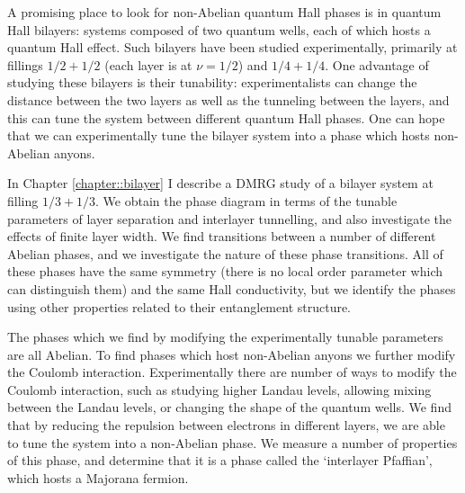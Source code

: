 A promising place to look for non-Abelian quantum Hall phases is in quantum Hall bilayers: systems composed of two quantum wells, each of which hosts a quantum Hall effect. Such bilayers have been studied experimentally, primarily at fillings $1/2+1/2$ (each layer is at $\nu=1/2$) and $1/4+1/4$\cite{JimReview}. One advantage of studying these bilayers is their tunability: experimentalists can change the distance between the two layers as well as the tunneling between the layers, and this can tune the system between different quantum Hall phases. One can hope that we can experimentally tune the bilayer system into a phase which hosts non-Abelian anyons.

In Chapter \ref{chapter::bilayer} I describe a DMRG study of a bilayer system at filling $1/3+1/3$. We obtain the phase diagram in terms of the tunable parameters of layer separation and interlayer tunnelling, and also investigate the effects of finite layer width. We find transitions between a number of different Abelian phases, and we investigate the nature of these phase transitions. All of these phases have the same symmetry (there is no local order parameter which can distinguish them) and the same Hall conductivity, but we identify the phases using other properties related to their entanglement structure.

The phases which we find by modifying the experimentally tunable parameters are all Abelian. To find phases which host non-Abelian anyons we further modify the Coulomb interaction. Experimentally there are number of ways to modify the Coulomb interaction, such as studying higher Landau levels, allowing mixing between the Landau levels, or changing the shape of the quantum wells. We find that by reducing the repulsion between electrons in different layers, we are able to tune the system into a non-Abelian phase. We measure a number of properties of this phase, and determine that it is a phase called the `interlayer Pfaffian', which hosts a Majorana fermion.




